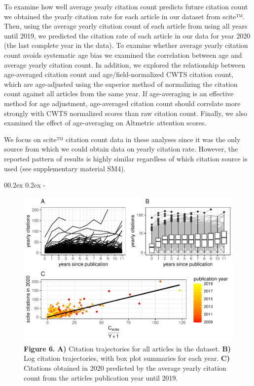 \documentclass[
  man,floatsintext]{apa6}
\makeatletter
\let\oldsubparagraph\subparagraph
\renewcommand{\subparagraph}[1]{\oldsubparagraph{#1}\mbox{}}
\renewcommand{\subparagraph}[1]{\@startsection{subparagraph}{5}{1em}%
  {0\baselineskip \@plus 0.2ex \@minus 0.2ex}%
  {-\z@\relax}%
  {\normalfont\normalsize\itshape\hspace{\parindent}{#1}\textit{\addperi}}{\relax}}
\makeatother
\begin{document}
To examine how well average yearly citation count predicts future citation count we obtained the yearly citation rate for each article in our dataset from scite™. Then, using the average yearly citation count of each article from using all years until 2019, we predicted the citation rate of each article in our data for year 2020 (the last complete year in the data). To examine whether average yearly citation count avoids systematic age bias we examined the correlation between age and average yearly citation count. In addition, we explored the relationship between age-averaged citation count and age/field-normalized CWTS citation count, which are age-adjusted using the superior method of normalizing the citation count against all articles from the same year. If age-averaging is an effective method for age adjustment, age-averaged citation count should correlate more strongly with CWTS normalized scores than raw citation count. Finally, we also examined the effect of age-averaging on Altmetric attention scores.

We focus on scite™ citation count data in these analyses since it was the only source from which we could obtain data on yearly citation rate. However, the reported pattern of results is highly similar regardless of which citation source is used (see supplementary material SM4).

\hypertarget{predictive-accuracy}{%
\subparagraph{Predictive accuracy}\label{predictive-accuracy}}

\begin{figure}
\centering
\includegraphics{RVcn_feasibility_in_social_neuroscience_files/figure-latex/fig6-1.pdf}
\caption{\label{fig:fig6}\textbf{Figure 6.} \textbf{A)} Citation trajectories for all articles in the dataset. \textbf{B)} Log citation trajectories, with box plot summaries for each year. \textbf{C)} Citations obtained in 2020 predicted by the average yearly citation count from the articles publication year until 2019.}
\end{figure}
\end{document}
